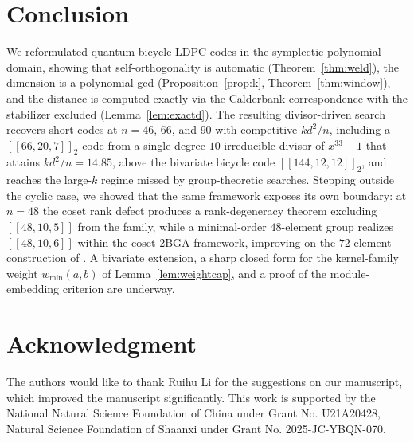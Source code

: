 \documentclass[journal,onecolumn]{IEEEtran}
\theoremstyle{definition}
\theoremstyle{remark}
\begin{document}
\section{Conclusion}\label{sec:concl}
We reformulated quantum bicycle LDPC codes in the symplectic polynomial
domain, showing that self-orthogonality is automatic
(Theorem~\ref{thm:weld}), the dimension is a polynomial gcd
(Proposition~\ref{prop:k}, Theorem~\ref{thm:window}), and the distance is
computed exactly via the Calderbank correspondence with the stabilizer
excluded (Lemma~\ref{lem:exactd}). The resulting divisor-driven search
recovers short codes at $n=46$, $66$, and $90$ with competitive
$kd^2/n$, including a $[[66,20,7]]_2$ code from a single degree-$10$
irreducible divisor of $x^{33}-1$ that attains $kd^2/n=14.85$, above the
bivariate bicycle code $[[144,12,12]]_2$, and reaches the large-$k$ regime
missed by group-theoretic searches. Stepping
outside the cyclic case, we showed that the same framework exposes its own
boundary: at $n=48$ the coset rank defect produces a rank-degeneracy theorem
excluding $[[48,10,5]]$ from the family, while a minimal-order $48$-element
group realizes $[[48,10,6]]$ within the coset-2BGA framework, improving on the
$72$-element construction of \cite{ATB}. A bivariate
extension, a sharp closed form for the kernel-family weight
$w_{\min}(a,b)$ of Lemma~\ref{lem:weightcap}, and a proof of the
module-embedding criterion are underway.

\section*{Acknowledgment}

The authors would like to thank Ruihu Li for the suggestions on our manuscript, which improved the manuscript significantly.
This work is supported by the National Natural Science Foundation of China under Grant No. U21A20428, Natural Science Foundation of Shaanxi under Grant No. 2025-JC-YBQN-070.




\end{document}
